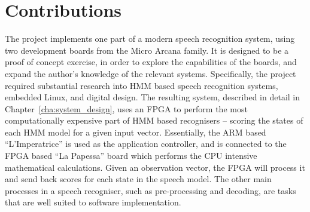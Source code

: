 \section{Contributions} %
\label{sec:contributions}
	The project implements one part of a modern speech recognition system, using two development boards from the Micro Arcana family.  It is designed to be a proof of concept exercise, in order to explore the capabilities of the boards, and expand the author's knowledge of the relevant systems.  Specifically, the project required substantial research into HMM based speech recognition systems, embedded Linux, and digital design.  The resulting system, described in detail in Chapter~\ref{cha:system_design}, uses an FPGA to perform the most computationally expensive part of HMM based recognisers -- scoring the states of each HMM model for a given input vector.  Essentially, the ARM based ``L'Imperatrice'' is used as the application controller, and is connected to the FPGA based ``La Papessa'' board which performs the CPU intensive mathematical calculations.  Given an observation vector, the FPGA will process it and send back scores for each state in the speech model.  The other main processes in a speech recogniser, such as pre-processing and decoding, are tasks that are well suited to software implementation.



